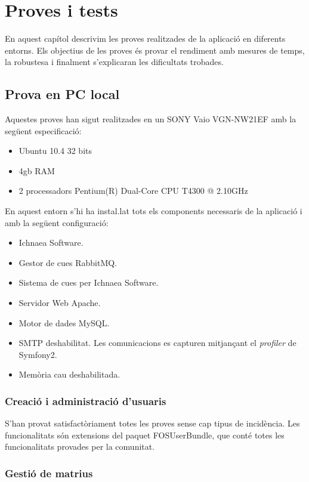 \chapter{Proves i tests}
\label{cha:tests}
En aquest capítol descrivim les proves realitzades de la aplicació en diferents entorns. Els objectius de les proves \'{e}s provar el rendiment amb mesures de temps, la robustesa i finalment s'explicaran les dificultats trobades.

\section{Prova en PC local}
Aquestes proves han sigut realitzades en un SONY Vaio VGN-NW21EF amb la següent especificaci\'{o}:
\begin{itemize}
\item Ubuntu 10.4 32 bits
\item 4gb RAM
\item 2 processadors Pentium(R) Dual-Core CPU T4300  @ 2.10GHz
\end{itemize}
En aquest entorn s'hi ha instal.lat tots els components necessaris de la aplicaci\'{o} i amb la següent configuraci\'{o}:
\begin{itemize}
\item Ichnaea Software.
\item Gestor de cues RabbitMQ.
\item Sistema de cues per Ichnaea Software.
\item Servidor Web Apache.
\item Motor de dades MySQL.
\item SMTP deshabilitat. Les comunicacions es capturen mitjançant el \textit{profiler} de Symfony2.
\item Memòria cau deshabilitada.
\end{itemize}

\subsection*{Creaci\'{o} i administraci\'{o} d'usuaris}
S'han provat satisfactòriament totes les proves sense cap tipus de incid\`{e}ncia. Les funcionalitats s\'{o}n extensions del paquet FOSUserBundle, que cont\'{e} totes les funcionalitats provades per la comunitat.\cite{fosuserbundle}

\subsection*{Gesti\'{o} de matrius}

